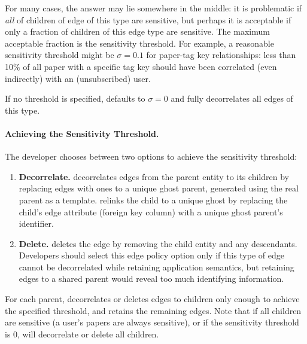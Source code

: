 For many cases, the answer may lie somewhere in the middle: it is problematic if \emph{all} of
children of edge of this type are sensitive, but perhaps it is acceptable if only a fraction of
children of this edge type are sensitive. The maximum acceptable fraction is the sensitivity
threshold. For example, a reasonable sensitivity threshold might be $\sigma = 0.1$ for paper-tag
key relationships: less than 10\% of all paper with a specific tag key should have been correlated
(even indirectly) with an (unsubscribed) user. 

If no threshold is specified, \sys defaults to $\sigma=0$ and fully
decorrelates all edges of this type. 

\paragraph{Achieving the Sensitivity Threshold.}
The developer chooses between two options to achieve the sensitivity threshold: 
\begin{enumerate}
    \item \textbf{Decorrelate.}
    \sys decorrelates edges from the parent entity to its children by 
    replacing edges with ones to a unique ghost parent, generated using the
    real parent as a template. \sys relinks the child to a unique ghost by replacing the child's edge
    attribute (foreign key column) with a unique ghost parent's identifier. 

\item \textbf{Delete.}
    \sys deletes the edge by removing the child entity and any descendants. Developers should select
    this edge policy option only if this type of edge cannot be decorrelated while retaining application
    semantics, but retaining edges to a shared parent would reveal too much identifying information.
\end{enumerate}

For each parent, \sys decorrelates or deletes edges to children only enough to achieve the specified
threshold, and retains the remaining edges. Note that if all children are sensitive (a user's papers
are always sensitive), or if the sensitivity threshold is 0, \sys will decorrelate or delete all
children. 

